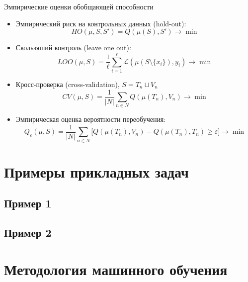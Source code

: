 \documentclass{beamer}
\begin{document}
\begin{frame}{Эмпирические оценки обобщающей способности}
\begin{itemize}
    \item Эмпирический риск на контрольных данных (hold-out):
    $$
        HO(\mu, S, S') = Q(\mu(S), S') \rightarrow \min
    $$
    \item Скользяший контроль (leave one out):
    $$
        LOO(\mu, S) = \frac{1}{\ell}\sum\limits_{i=1}^{\ell}\mathscr{L}(\mu(S\setminus \{x_i\}), y_i) \rightarrow \min
    $$
    \item Кросс-проверка (cross-validation), $S = T_n \sqcup V_n$
    $$
        CV(\mu, S) = \frac{1}{|N|}\sum\limits_{n \in N} Q(\mu(T_n), V_n) \rightarrow \min
    $$
    \item Эмпирическая оценка вероятности переобучения:
    $$
    Q_{\varepsilon}(\mu, S) = \frac{1}{|N|}\sum\limits_{n \in N}\lbrack Q(\mu(T_n), V_n) - Q(\mu(T_n), T_n) \ge \varepsilon \rbrack \rightarrow \min
    $$
\end{itemize}
\end{frame}

\section{Примеры прикладных задач}
\subsection{Пример 1}
\begin{frame}
\end{frame}
\subsection{Пример 2}
\begin{frame}
\end{frame}
\section{Методология машинного обучения}
\end{document}
